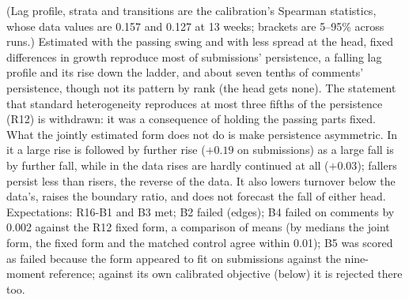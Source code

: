 \documentclass[10pt]{article}
\begin{document}
(Lag profile, strata and transitions are the calibration's Spearman statistics, whose data values are 0.157 and 0.127 at 13 weeks; brackets are 5--95\% across runs.) Estimated with the passing swing and with less spread at the head, fixed differences in growth reproduce most of submissions' persistence, a falling lag profile and its rise down the ladder, and about seven tenths of comments' persistence, though not its pattern by rank (the head gets none). The statement that standard heterogeneity reproduces at most three fifths of the persistence (R12) is withdrawn: it was a consequence of holding the passing parts fixed. What the jointly estimated form does not do is make persistence asymmetric. In it a large rise is followed by further rise ($+0.19$ on submissions) as a large fall is by further fall, while in the data rises are hardly continued at all ($+0.03$); fallers persist less than risers, the reverse of the data. It also lowers turnover below the data's, raises the boundary ratio, and does not forecast the fall of either head. Expectations: R16-B1 and B3 met; B2 failed (edges); B4 failed on comments by 0.002 against the R12 fixed form, a comparison of means (by medians the joint form, the fixed form and the matched control agree within 0.01); B5 was scored as failed because the form appeared to fit on submissions against the nine-moment reference; against its own calibrated objective (below) it is rejected there too.
\end{document}
